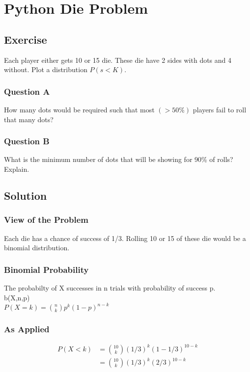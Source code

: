 \documentclass[12pt]{article}
\begin{document}
\section{Python Die Problem}
\subsection{Exercise}
Each player either gets 10 or 15 die. These die have 2 sides with dots and 4 without. 
Plot a distribution $P(s<K)$. 
\subsubsection{Question A}
How many dots would be required such that most $(>50\%)$ players fail to roll that many dots?
\subsubsection{Question B}
What is the minimum number of dots that will be showing for 90\% of rolls? Explain.

\subsection{Solution}
\subsubsection{View of the Problem}
Each die has a chance of success of 1/3. Rolling 10 or 15 of these die would be a binomial distribution.

\subsubsection{Binomial Probability}
The probabilty of X successes in n trials with probability of success p.\\
 b(X,n,p)\\
$P(X=k)=\binom{n}{k}p^k(1-p)^{n-k}$

\subsubsection{As Applied}
\begin{align*}
P(X<k)&=\binom{10}{k}(1/3)^k(1-1/3)^{10-k}\\
&=\binom{10}{k}(1/3)^k(2/3)^{10-k}
\end{align*}
\end{document}
